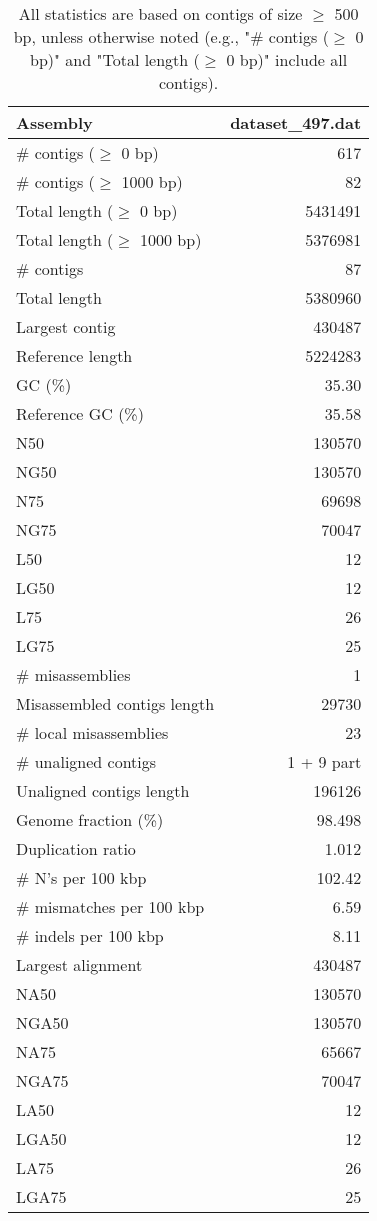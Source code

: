 \documentclass[12pt,a4paper]{article}
\begin{document}
\begin{table}[ht]
\begin{center}
\caption{All statistics are based on contigs of size $\geq$ 500 bp, unless otherwise noted (e.g., "\# contigs ($\geq$ 0 bp)" and "Total length ($\geq$ 0 bp)" include all contigs).}
\begin{tabular}{|l*{1}{|r}|}
\hline
Assembly & dataset\_497.dat \\ \hline
\# contigs ($\geq$ 0 bp) & 617 \\ \hline
\# contigs ($\geq$ 1000 bp) & 82 \\ \hline
Total length ($\geq$ 0 bp) & 5431491 \\ \hline
Total length ($\geq$ 1000 bp) & 5376981 \\ \hline
\# contigs & 87 \\ \hline
Total length & 5380960 \\ \hline
Largest contig & 430487 \\ \hline
Reference length & 5224283 \\ \hline
GC (\%) & 35.30 \\ \hline
Reference GC (\%) & 35.58 \\ \hline
N50 & 130570 \\ \hline
NG50 & 130570 \\ \hline
N75 & 69698 \\ \hline
NG75 & 70047 \\ \hline
L50 & 12 \\ \hline
LG50 & 12 \\ \hline
L75 & 26 \\ \hline
LG75 & 25 \\ \hline
\# misassemblies & 1 \\ \hline
Misassembled contigs length & 29730 \\ \hline
\# local misassemblies & 23 \\ \hline
\# unaligned contigs & 1 + 9 part \\ \hline
Unaligned contigs length & 196126 \\ \hline
Genome fraction (\%) & 98.498 \\ \hline
Duplication ratio & 1.012 \\ \hline
\# N's per 100 kbp & 102.42 \\ \hline
\# mismatches per 100 kbp & 6.59 \\ \hline
\# indels per 100 kbp & 8.11 \\ \hline
Largest alignment & 430487 \\ \hline
NA50 & 130570 \\ \hline
NGA50 & 130570 \\ \hline
NA75 & 65667 \\ \hline
NGA75 & 70047 \\ \hline
LA50 & 12 \\ \hline
LGA50 & 12 \\ \hline
LA75 & 26 \\ \hline
LGA75 & 25 \\ \hline
\end{tabular}
\end{center}
\end{table}
\end{document}
